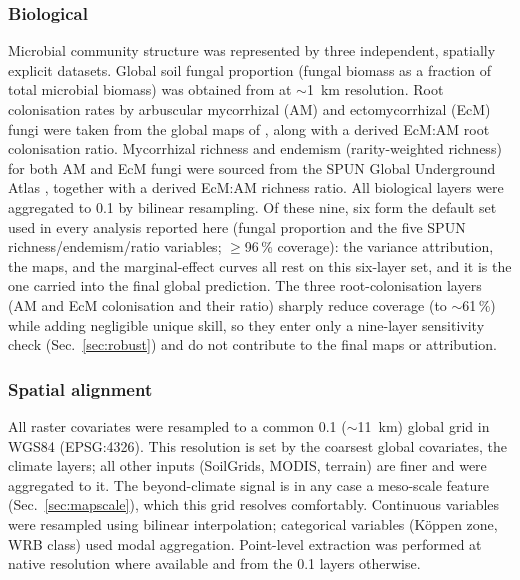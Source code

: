 \documentclass[12pt, a4paper]{article}
\begin{document}
\subsubsection{Biological}

Microbial community structure was represented by three independent,
spatially explicit datasets. Global soil fungal proportion (fungal
biomass as a fraction of total microbial biomass) was obtained from
\citet{Yu2022} at ${\sim}$1~km resolution. Root colonisation rates by
arbuscular mycorrhizal (AM) and ectomycorrhizal (EcM) fungi were taken
from the global maps of \citet{Barcelo2023}, along with a derived
EcM:AM root colonisation ratio. Mycorrhizal richness and endemism
(rarity-weighted richness) for both AM and EcM fungi were sourced from
the SPUN Global Underground Atlas \citep{VanNuland2025}, together with
a derived EcM:AM richness ratio. All biological layers were aggregated
to 0.1\textdegree{} by bilinear resampling. Of these nine, six form the
default set used in every analysis reported here (fungal proportion and
the five SPUN richness/endemism/ratio variables; $\geq$96\,\% coverage):
the variance attribution, the maps, and the marginal-effect curves all
rest on this six-layer set, and it is the one carried into the final
global prediction. The three \citet{Barcelo2023} root-colonisation layers
(AM and EcM colonisation and their ratio) sharply reduce coverage (to
${\sim}$61\,\%) while adding negligible unique skill, so they enter only a
nine-layer sensitivity check (Sec.~\ref{sec:robust}) and do not contribute
to the final maps or attribution.

\subsubsection{Spatial alignment}

All raster covariates were resampled to a common 0.1\textdegree{}
($\sim$11~km) global grid in WGS84 (EPSG:4326). This resolution is set by the
coarsest global covariates, the climate layers; all other inputs (SoilGrids,
MODIS, terrain) are finer and were aggregated to it. The beyond-climate signal is
in any case a meso-scale feature (Sec.~\ref{sec:mapscale}), which this grid
resolves comfortably. Continuous variables
were resampled using bilinear interpolation; categorical variables
(K\"oppen zone, WRB class) used modal aggregation. Point-level
extraction was performed at native resolution where available and from
the 0.1\textdegree{} layers otherwise.

\end{document}

